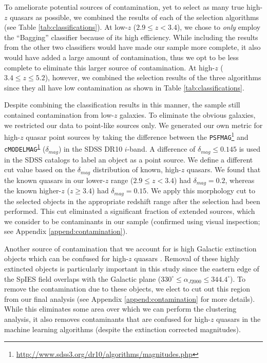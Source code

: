 \documentclass[apj, numberedappendix]{emulateapj}
\begin{document}
To ameliorate potential sources of contamination, yet to select as many true high-$z$ quasars as possible, we combined the results of each of the selection algorithms (see Table \ref{tab:classifications}). At low-$z$ ($2.9 \leq z < 3.4$), we chose to \emph{only} employ the ``Bagging'' classifier because of its high efficiency. While including the results from the other two classifiers would have made our sample more complete, it also would have added a large amount of contamination, thus we opt to be less complete to eliminate this larger source of contamination. At high-$z$ ($3.4 \leq z \leq 5.2$), however, we combined the selection results of the three algorithms since they all have low contamination as shown in Table \ref{tab:classifications}. 

Despite combining the classification results in this manner, the sample still contained contamination from low-$z$ galaxies. To eliminate the obvious galaxies, we restricted our data to point-like sources only. We generated our own metric for high-$z$ quasar point sources by taking the difference between the {\tt PSFMAG}\footnote{\label{notemags}\url{http://www.sdss3.org/dr10/algorithms/magnitudes.php}} and {\tt cMODELMAG}\textsuperscript{\ref{notemags}} ($\delta_{mag}$) in the SDSS DR10 $i$-band. A difference of $\delta_{mag}\leq 0.145$ is used in the SDSS catalogs to label an object as a point source. We define a different cut value based on the $\delta_{mag}$ distribution of known, high-$z$ quasars. We found that the known quasars in our lower-$z$ range ($2.9 \leq z < 3.4$) had $\delta_{mag}=0.2$, whereas the known higher-$z$ ($z \geq 3.4$) had $\delta_{mag}=0.15$. We apply this morphology cut to the selected objects in the appropriate redshift range after the selection had been performed. This cut eliminated a significant fraction of extended sources, which we consider to be contaminants in our sample (confirmed using visual inspection; see Appendix \ref{append:contamination}).

Another source of contamination that we account for is high Galactic extinction objects which can be confused for high-$z$ quasars \citep{Myers2006}. Removal of these highly extincted objects is particularly important in this study since the eastern edge of the SpIES field overlaps with the Galactic plane ($330^{\circ} \leq \alpha_{J2000} \leq 344.4^{\circ}$). To remove the contamination due to these objects, we elect to cut out this region from our final analysis (see Appendix \ref{append:contamination} for more details). While this eliminates some area over which we can perform the clustering analysis, it also removes contaminants that are confused for high-$z$ quasars in the machine learning algorithms (despite the extinction corrected magnitudes).
\end{document}
